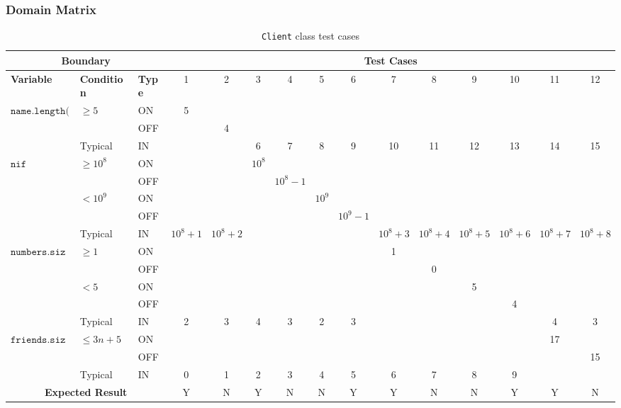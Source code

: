 \subsubsection{Domain Matrix}
\label{sec:classes.client.matrix}
\begin{sidewaystable}[H]
  \centering
  \small
  \begin{tabular}{|*{3}{l|}*{12}{c|}}
    \hline
    \multicolumn{3}{|c|}{\textbf{Boundary}}
      & \multicolumn{12}{|c|}{\textbf{Test Cases}} \\ \hline
    \textbf{Variable} & \textbf{Condition} & \textbf{Type}
      & 1 & 2 & 3 & 4 & 5 & 6 & 7 & 8 & 9 & 10 & 11 & 12  \\ \hline
    $\texttt{name.length()}$
    & $\ge 5$
              & ON  &5&&&&&&&&&&& \\ \cline{3-15}
    &         & OFF &&4&&&&&&&&&& \\ \cline{2-15}
    & Typical & IN
      &&& 6 & 7 & 8 & 9 & 10 & 11 & 12 & 13 & 14 & 15 \\ \hline
    $\texttt{nif}$
    & $\ge 10^8$
              & ON  &&&$10^8$&&&&&&&&&   \\ \cline{3-15}
    &         & OFF &&&&$10^8-1$&&&&&&&& \\ \cline{2-15}
    & $< 10^9$
              & ON  &&&&&$10^9$&&&&&&&   \\ \cline{3-15}
    &         & OFF &&&&&&$10^9-1$&&&&&& \\ \cline{2-15}
    & Typical & IN
      & $10^8+1$ & $10^8+2$ &&&&& $10^8+3$ & $10^8+4$ & $10^8+5$ & $10^8+6$
      & $10^8+7$ & $10^8+8$  \\ \hline
    $\texttt{numbers.size()}$
    & $\ge 1$
              & ON  &&&&&&&1&&&&& \\ \cline{3-15}
    &         & OFF &&&&&&&&0&&&& \\ \cline{2-15}
    & $< 5$
              & ON  &&&&&&&&&5&&& \\ \cline{3-15}
    &         & OFF &&&&&&&&&&4&& \\ \cline{2-15}
    & Typical & IN
      & 2 & 3 & 4 & 3 & 2 & 3 &&&&& 4 & 3 \\ \hline
    $\texttt{friends.size()}$
    & $\le 3n + 5$
              & ON  &&&&&&&&&&&17& \\ \cline{3-15}
    &         & OFF &&&&&&&&&&&&15 \\ \cline{2-15}
    & Typical & IN
      &0&1&2&3&4&5&6&7&8&9&& \\ \hline
    \multicolumn{3}{|c|}{\textbf{Expected Result}}
      & Y & N & Y & N & N & Y & Y & N & N & Y & Y & N \\ \hline
  \end{tabular}
  \caption{\texttt{Client} class test cases}
  \label{tab:classes.client.matrix}
\end{sidewaystable}
\clearpage